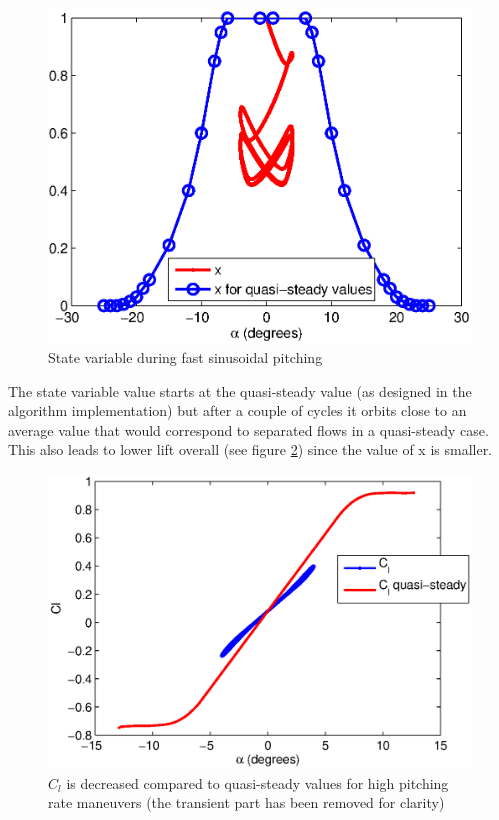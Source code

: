 \begin{figure}[h]
  \centering
  \includegraphics{./Figures/x_sin_amp=4_k=0p5.eps}
  \caption{State variable during fast sinusoidal pitching}
  \label{fig:x_fast_pitching}
\end{figure}

\par The state variable value starts at the quasi-steady value (as designed in the algorithm implementation) but after a couple of cycles it orbits close to an average value that would correspond to separated flows in a quasi-steady case.
This also leads to lower lift overall (see figure \ref{fig:Cl_fast_pitching}) since the value of x is smaller.

\begin{figure}[h]
  \centering
  \includegraphics{./Figures/Cl_vs_alpha_amp=4_k=0p5.eps}
  \caption{$C_l$ is decreased compared to quasi-steady values for high pitching rate maneuvers (the transient part has been removed for clarity)}
  \label{fig:Cl_fast_pitching}
\end{figure}



